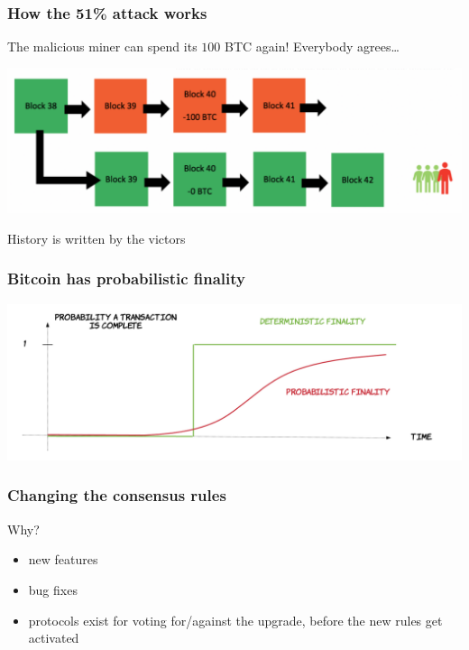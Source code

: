 \documentclass[11pt]{beamer}  %
\begin{document}
\begin{frame}\frametitle{How the 51\% attack works}

  \begin{greenbox}{The malicious miner can spend its $100$ BTC again! Everybody agrees\ldots}
  \begin{center}
    \includegraphics[width=\textwidth,clip=false]{pictures/51attack_4.png}
  \end{center}
  \end{greenbox}

  \bigskip

  \begin{center}
    History is written by the victors
  \end{center}

\end{frame}

\begin{frame}\frametitle{Bitcoin has probabilistic finality}

  \begin{center}
    \includegraphics[width=\textwidth,clip=false]{pictures/finality.png}
  \end{center}

\end{frame}

\begin{frame}\frametitle{Changing the consensus rules}

  \begin{greenbox}{Why?}
    \begin{itemize}
    \item new features
    \item bug fixes
    \item protocols exist for voting for/against the upgrade, before the new rules
      get activated
    \end{itemize}
  \end{greenbox}

\end{frame}
\end{document}
